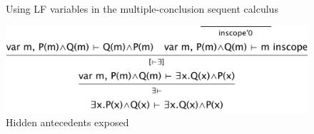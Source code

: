 \begin{figure}
\centering
{}\qquad
{}\qquad
{}\qquad
{}\qquad
\caption{Using LF variables in the multiple-conclusion sequent calculus}
\label{fig:LF}
\end{figure}


\begin{figure}
\centering
\includegraphics[scale=0.5]{pics/LF2a}
\caption{Hidden antecedents exposed}
\label{fig:LFa}
\end{figure}


